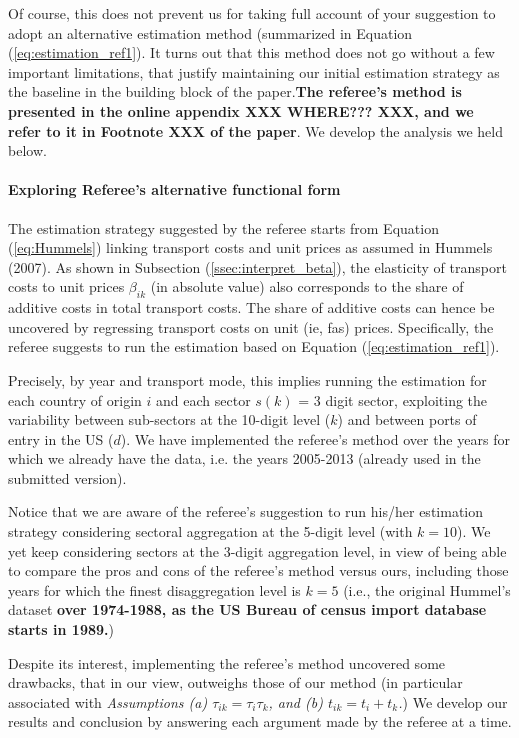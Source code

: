 \documentclass[a4paper,12pt]{article}
\begin{document}
Of course, this does not prevent us for taking full account of your suggestion to adopt an alternative estimation method (summarized in Equation (\ref{eq:estimation_ref1}). It turns out that this method does not go without a few important limitations, that justify maintaining our initial estimation strategy as the baseline in the building block of the paper.\textbf{The referee's method is presented in the online appendix XXX WHERE??? XXX, and we refer to it in Footnote XXX of the paper}. We develop the analysis we held below.



\paragraph{Exploring Referee's alternative functional form \label{subsec:functional_form}}

The estimation strategy suggested by the referee starts from Equation (\ref{eq:Hummels}) linking transport costs and unit prices as assumed in Hummels (2007). As shown in Subsection (\ref{ssec:interpret_beta}), the elasticity of transport costs to unit prices $\beta_{ik}$ (in absolute value) also corresponds to the share of additive costs in total transport costs. The share of additive costs can hence be uncovered by regressing transport costs on unit (ie, fas) prices. Specifically, the referee suggests to run the estimation based on Equation (\ref{eq:estimation_ref1}).

Precisely, by year and transport mode, this implies running the estimation for each country of origin $i$ and each sector $s(k)$ = 3 digit sector, exploiting the variability between sub-sectors at the 10-digit level ($k$) and between ports of entry in the US ($d$). We have implemented the referee's method over the years for which we already have the data, i.e. the years 2005-2013 (already used in the submitted version).

Notice that we are aware of the referee's suggestion to run his/her estimation strategy considering sectoral aggregation at the 5-digit level (with $k=10$). We yet keep considering sectors at the 3-digit aggregation level, in view of being able to compare the pros and cons of the referee's method versus ours, including those years for which the finest disaggregation level is $k=5$ (i.e., the original Hummel's dataset \textbf{over 1974-1988, as the US Bureau of census import database starts in 1989.})

Despite its interest, implementing the referee's method uncovered some drawbacks, that in our view, outweighs those of our method (in particular associated with \textit{Assumptions (a) $\tau_{ik} = \tau_i\tau_{k}$, and (b) $t_{ik} = t_i+ t_{k}$.}) We develop our results and conclusion by answering each argument made by the referee at a time.
\end{document}
